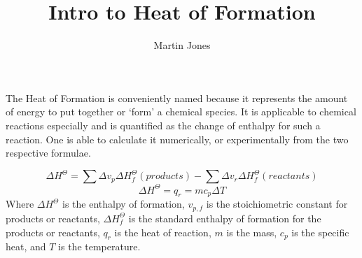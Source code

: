 \documentclass{article}
\begin{document}
\title{Intro to Heat of Formation}
\date{}
\author{Martin Jones}
\maketitle
\thispagestyle{empty}

The Heat of Formation is conveniently named because it represents the amount of energy to put together or `form' a chemical species. It is applicable to chemical reactions especially and is quantified as the change of enthalpy for such a reaction. One is able to calculate it numerically, or experimentally from the two respective formulae.

\begin{equation}
\Delta H^{\Theta}=\sum \Delta v_{p}\Delta H^{\Theta}_{f}(products)-\sum \Delta v_{r}\Delta H^{\Theta}_{f}(reactants)
\end{equation}
\begin{equation}
\Delta H^{\Theta}=q_{r}=mc_{p}\Delta T
\end{equation}
Where $\Delta H^{\Theta}$ is the enthalpy of formation, $v_{p,f}$ is the stoichiometric constant for products or reactants, $\Delta H^{\Theta}_{f}$ is the standard enthalpy of formation for the products or reactants, $q_{r}$ is the heat of reaction, $m$ is the mass, $c_p$ is the specific heat, and $T$ is the temperature.  
\end{document}
